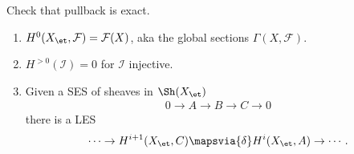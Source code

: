 \begin{exercise}[?]

Check that pullback is exact.

\end{exercise}

\begin{proposition}

\envlist

\begin{enumerate}
\def\labelenumi{\arabic{enumi}.}
\item
  \(H^0(X_\et, \mathcal{F}) = \mathcal{F}(X)\), aka the global sections
  \(\Gamma(X, \mathcal{F})\).
\item
  \(H^{>0}(\mathcal{I}) = 0\) for \(\mathcal{I}\) injective.
\item
  Given a SES of sheaves in \(\Sh(X_\et)\)
  \begin{align*}  
  0 \to A\to B \to C \to 0
  \end{align*} there is a LES
  \begin{align*}  
    \cdots \to H^{i+1}(X_\et, C) \mapsvia{\delta} H^i(X_\et, A) \to \cdots
    .\end{align*}
\end{enumerate}

\end{proposition}

